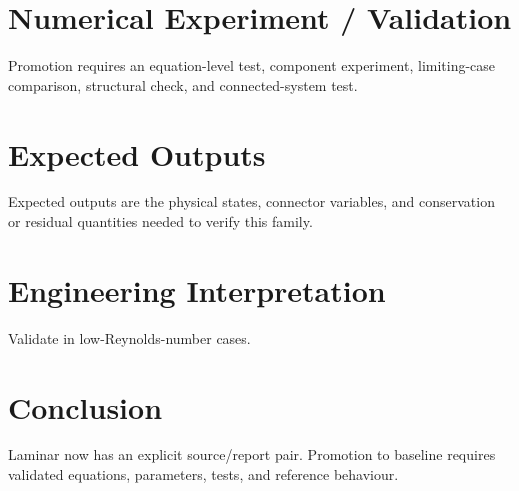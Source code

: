 \documentclass[10pt,a4paper]{article}
\begin{document}
\section{Numerical Experiment / Validation}Promotion requires an equation-level test, component experiment, limiting-case comparison, structural check, and connected-system test.
\section{Expected Outputs}Expected outputs are the physical states, connector variables, and conservation or residual quantities needed to verify this family.
\section{Engineering Interpretation}Validate in low-Reynolds-number cases.
\section*{Conclusion}Laminar now has an explicit source/report pair. Promotion to baseline requires validated equations, parameters, tests, and reference behaviour.
\end{document}
